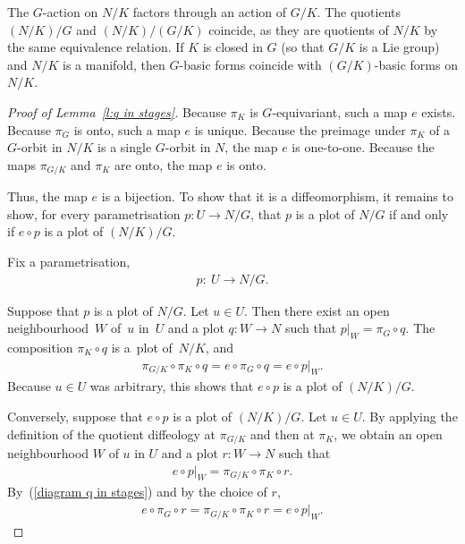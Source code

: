 \begin{Remark} \label{r:splits}
The $G$-action on $N/K$ factors through an action of $G/K$.
The quotients $(N/K)/G$ and $(N/K)/(G/K)$ coincide,
as they are quotients of $N/K$ by the same equivalence relation.
If $K$ is closed in $G$ (so that $G/K$ is a Lie group)
and $N/K$ is a manifold, then $G$-basic forms coincide with $(G/K)$-basic forms
on $N/K$.
\end{Remark}


\begin{proof}[Proof of Lemma~\ref{l:q in stages}]
Because $\pi_K$ is $G$-equivariant, such a map $e$ exists.
Because $\pi_G$ is onto, such a map $e$ is unique.
Because the preimage under $\pi_K$ of a $G$-orbit in $N/K$
is a single $G$-orbit in $N$, the map $e$ is one-to-one.
Because the maps $\pi_{G/K}$ and $\pi_K$ are onto,
the map $e$ is onto.

Thus, the map $e$ is a bijection. To show that it is a dif\/feomorphism,
it remains to show,
for every parametrisation $p \colon U \to N/G$,
that $p$ is a plot of $N/G$ if and only if $e \circ p$ is a plot of $(N/K)/G$.

Fix a parametrisation,
\begin{gather*} p \colon \ U \to N/G.\end{gather*}

Suppose that $p$ is a plot of $N/G$. Let $u \in U$.
Then there exist an open neighbourhood~$W$ of~$u$ in~$U$
and a plot $q \colon W \to N$ such that $p|_W = \pi_G \circ q$.
The composition $\pi_K \circ q$ is a~plot of~$N/K$, and
\begin{gather*} \pi_{G/K} \circ \pi_K \circ q = e \circ \pi_G \circ q = e \circ p|_W.\end{gather*}
Because $u \in U$ was arbitrary,
this shows that $e \circ p$ is a plot of $(N/K)/G$.

Conversely, suppose that $e \circ p$ is a plot of $(N/K)/G$.
Let $u \in U$. By applying the def\/inition of the quotient dif\/feology
at $\pi_{G/K}$ and then at $\pi_K$,
we obtain an open neighbourhood $W$ of $u$ in $U$
and a plot $r \colon W \to N$ such that
\begin{gather*} e \circ p|_W = \pi_{G/K} \circ \pi_K \circ r .\end{gather*}
By~(\ref{diagram q in stages}) and by the choice of $r$,
\begin{gather*}e \circ \pi_G \circ r = \pi_{G/K} \circ \pi_K \circ r = e \circ p|_W.\end{gather*}


\end{proof}
